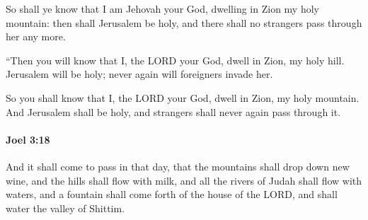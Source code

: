 			\begin{versebox}
					\item[BHS] 
					\item[LXX] 
					\item[ASV] So shall ye know that I am Jehovah your God, dwelling in Zion my holy mountain: then shall Jerusalem be holy, and there shall no strangers pass through her any more.
					\item[NIV] “Then you will know that I, the LORD your God, dwell in Zion, my holy hill. Jerusalem will be holy; never again will foreigners invade her.
					\item[NRSV] So you shall know that I, the LORD your God, dwell in Zion, my holy mountain. And Jerusalem shall be holy, and strangers shall never again pass through it.
			\end{versebox}

		\paragraph{Joel 3:18} %
			\label{JOEL-3-18}

			And it shall come to pass in that day, that the mountains shall drop down new wine, and the hills shall flow with milk, and all the rivers of Judah shall flow with waters, and a fountain shall come forth of the house of the LORD, and shall water the valley of Shittim.

